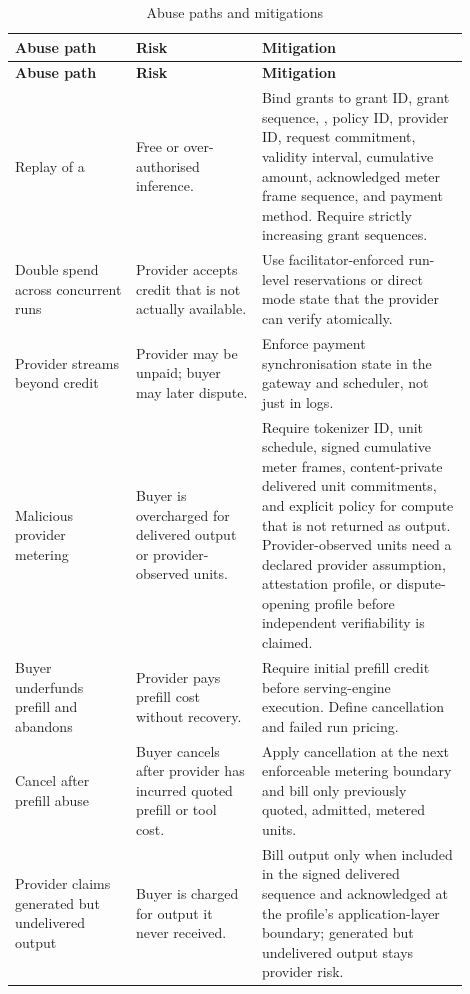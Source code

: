 \documentclass[11pt]{article}
\newcommand{\field}[1]{\texttt{\detokenize{#1}}}
\begin{document}
\begin{longtable}{>{\raggedright\arraybackslash}p{0.24\linewidth} >{\raggedright\arraybackslash}p{0.25\linewidth} >{\raggedright\arraybackslash}p{0.41\linewidth}}
\caption{Abuse paths and mitigations}\label{tab:abuse-mitigations}\\
\toprule
\textbf{Abuse path} & \textbf{Risk} & \textbf{Mitigation} \\
\midrule
\endfirsthead
\toprule
\textbf{Abuse path} & \textbf{Risk} & \textbf{Mitigation} \\
\midrule
\endhead
Replay of a \field{CreditGrant} & Free or over-authorised inference. & Bind grants to grant ID, grant sequence, \field{run_id}, policy ID, provider ID, request commitment, validity interval, cumulative amount, acknowledged meter frame sequence, and payment method. Require strictly increasing grant sequences. \\
Double spend across concurrent runs & Provider accepts credit that is not actually available. & Use facilitator-enforced run-level reservations or direct mode state that the provider can verify atomically. \\
Provider streams beyond credit & Provider may be unpaid; buyer may later dispute. & Enforce payment synchronisation state in the gateway and scheduler, not just in logs. \\
Malicious provider metering & Buyer is overcharged for delivered output or provider-observed units. & Require tokenizer ID, unit schedule, signed cumulative meter frames, content-private delivered unit commitments, and explicit policy for compute that is not returned as output. Provider-observed units need a declared provider assumption, attestation profile, or dispute-opening profile before independent verifiability is claimed. \\
Buyer underfunds prefill and abandons & Provider pays prefill cost without recovery. & Require initial prefill credit before serving-engine execution. Define cancellation and failed run pricing. \\
Cancel after prefill abuse & Buyer cancels after provider has incurred quoted prefill or tool cost. & Apply cancellation at the next enforceable metering boundary and bill only previously quoted, admitted, metered units. \\
Provider claims generated but undelivered output & Buyer is charged for output it never received. & Bill output only when included in the signed delivered sequence and acknowledged at the profile's application-layer boundary; generated but undelivered output stays provider risk. \\

\end{longtable}
\end{document}
